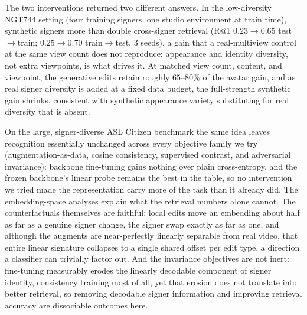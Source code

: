 The two interventions returned two different answers. In the
low-diversity NGT744 setting (four training signers, one studio
environment at train time), synthetic signers more than double
cross-signer retrieval (R@1 $0.23 \to 0.65$ test$\to$train; $0.25 \to
0.70$ train$\to$test, 3 seeds), a gain that a real-multiview control at
the same view count does not reproduce: appearance and identity
diversity, not extra viewpoints, is what drives it. At matched view
count, content, and viewpoint, the generative edits retain roughly
$65$--$80\%$ of the avatar gain, and as real signer diversity is added
at a fixed data budget, the full-strength synthetic gain shrinks,
consistent with synthetic appearance variety substituting for real
diversity that is absent.

On the large, signer-diverse ASL Citizen benchmark the same idea leaves
recognition essentially unchanged across every objective family we try
(augmentation-as-data, cosine consistency, supervised contrast, and
adversarial invariance): backbone fine-tuning gains nothing over plain
cross-entropy, and the frozen backbone's linear probe remains the best in
the table, so no intervention we tried made the representation carry more
of the task than it already did.
The embedding-space analyses explain what the retrieval numbers alone
cannot. The counterfactuals themselves are faithful: local edits move an
embedding about half as far as a genuine signer change, the signer swap
exactly as far as one, and although the augments are near-perfectly
linearly separable from real video, that entire linear signature
collapses to a single shared offset per edit type, a direction a
classifier can trivially factor out.
And the invariance objectives are not inert: fine-tuning measurably
erodes the linearly decodable component of signer identity,
consistency training most of all, yet that erosion does not translate
into better retrieval, so removing decodable signer information and
improving retrieval accuracy are dissociable outcomes here.


